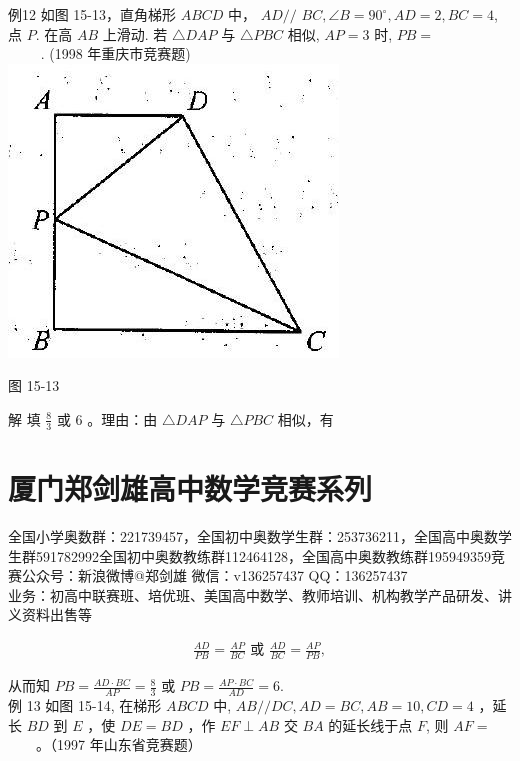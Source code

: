\documentclass[10pt]{article}
\begin{document}
例12 如图 15-13，直角梯形 $A B C D$ 中， $A D / /$ $B C, \angle B=90^{\circ}, A D=2, B C=4$, 点 $P$. 在高 $A B$ 上滑动. 若 $\triangle D A P$ 与 $\triangle P B C$ 相似, $A P=3$ 时, $P B=$\\
$\qquad$ . (1998 年重庆市竞赛题)\\
\includegraphics[max width=\textwidth, center]{2024_10_30_2c8f45efd4a519b08e1ag-142(2)}

图 15-13

解 填 $\frac{8}{3}$ 或 6 。理由：由 $\triangle D A P$ 与 $\triangle P B C$ 相似，有

\section*{厦门郑剑雄高中数学竞赛系列}
全国小学奥数群：221739457，全国初中奥数学生群：253736211，全国高中奥数学生群591782992全国初中奥数教练群112464128，全国高中奥数教练群195949359竞赛公众号：新浪微博@郑剑雄 微信：v136257437 QQ：136257437\\
业务：初高中联赛班、培优班、美国高中数学、教师培训、机构教学产品研发、讲义资料出售等

\begin{align*}
\frac{A D}{P B}=\frac{A P}{B C} \text { 或 } \frac{A D}{B C}=\frac{A P}{P B},
\end{align*}

从而知 $P B=\frac{A D \cdot B C}{A P}=\frac{8}{3}$ 或 $P B=\frac{A P \cdot B C}{A D}=6$.\\
例 13 如图 15-14, 在梯形 $A B C D$ 中, $A B / / D C, A D=B C, A B=10, C D=4$ ，延长 $B D$ 到 $E$ ，使 $D E=B D$ ，作 $E F \perp A B$ 交 $B A$ 的延长线于点 $F$, 则 $A F=$ $\qquad$。（1997 年山东省竞赛题）
\end{document}
